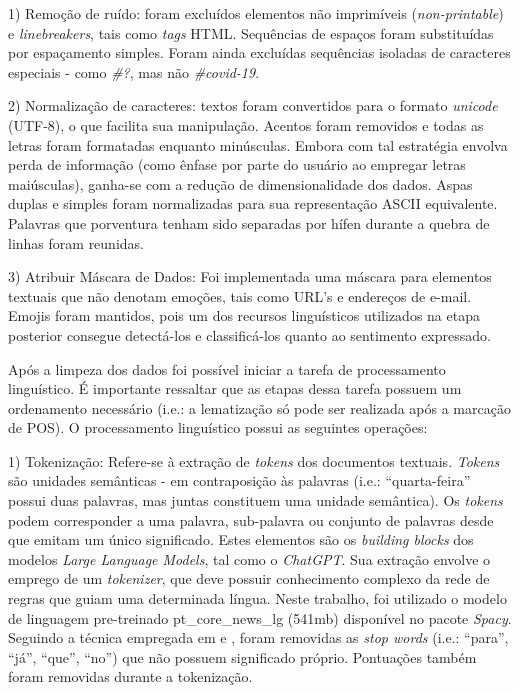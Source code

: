 \bigskip

1) Remoção de ruído: foram excluídos elementos não imprimíveis (\textit{non-printable}) e \textit{linebreakers}, tais como \textit{tags} HTML. Sequências de espaços foram substituídas por espaçamento simples. Foram ainda excluídas sequências isoladas de caracteres especiais - como \textit{\#?}, mas não \textit{\#covid-19}. 

\bigskip

2) Normalização de caracteres: textos foram convertidos para o formato \textit{unicode} (UTF-8), o que facilita sua manipulação. Acentos foram removidos e todas as letras foram formatadas enquanto minúsculas. Embora com tal estratégia envolva perda de informação (como ênfase por parte do usuário ao empregar letras maiúsculas), ganha-se com a redução de dimensionalidade dos dados. Aspas duplas e simples foram normalizadas para sua representação ASCII equivalente. Palavras que porventura tenham sido separadas por hífen durante a quebra de linhas foram reunidas.

\bigskip

3) Atribuir Máscara de Dados: Foi implementada uma máscara para elementos textuais que não denotam emoções, tais como URL's e endereços de e-mail. Emojis foram mantidos, pois um dos recursos linguísticos utilizados na etapa posterior consegue detectá-los e classificá-los quanto ao sentimento expressado.

\bigskip

Após a limpeza dos dados foi possível iniciar a tarefa de processamento linguístico. É importante ressaltar que as etapas dessa tarefa possuem um ordenamento necessário (i.e.: a lematização só pode ser realizada após a marcação de POS). O processamento linguístico possui as seguintes operações:

1) Tokenização: Refere-se à extração de \textit{tokens} dos documentos textuais. \textit{Tokens} são unidades semânticas - em contraposição às palavras (i.e.: \enquote{quarta-feira} possui duas palavras, mas juntas constituem uma unidade semântica). Os \textit{tokens} podem corresponder a uma palavra, sub-palavra ou conjunto de palavras desde que emitam um único significado. Estes elementos são os \textit{building blocks} dos modelos \textit{Large Language Models}, tal como o \textit{ChatGPT}. Sua extração envolve o emprego de um \textit{tokenizer}, que deve possuir conhecimento complexo da rede de regras que guiam uma determinada língua. Neste trabalho, foi utilizado o modelo de linguagem pre-treinado pt\_core\_news\_lg (541mb) disponível no pacote \textit{Spacy}. Seguindo a técnica empregada em \textcite{de_melo_comparing_2021} e \textcite{januario_sentiment_2022}, foram removidas as \textit{stop words} (i.e.: \enquote{para}, \enquote{já}, \enquote{que}, \enquote{no}) que não possuem significado próprio. Pontuações também foram removidas durante a tokenização.

